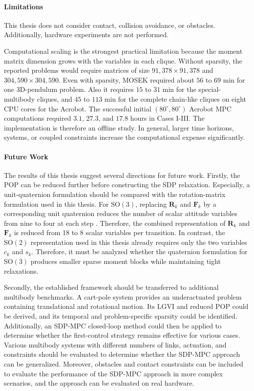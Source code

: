 \paragraph{Limitations}

This thesis does not consider contact, collision avoidance, or obstacles. Additionally,
hardware experiments are not performed.

Computational scaling is the strongest practical limitation because the moment
matrix dimension grows with the variables in each clique. Without
sparsity, the reported problems would require matrices of size
$91{,}378\times91{,}378$ and $304{,}590\times304{,}590$. Even with sparsity,
MOSEK required about $56$ to $69$ min for one 3D-pendulum problem. Also 
it requires 
$15$ to $31$ min for the special-multibody cliques, and $45$ to $113$ min
for the complete chain-like cliques on eight CPU cores for the Acrobot. The successful initial
$(80^\circ,80^\circ)$ Acrobot MPC computations required $3.1$, $27.3$, and $17.8$ hours
in Cases I-III. The implementation is therefore an offline study. In general, larger
time horizons, systems, or coupled constraints increase the computational
expense significantly.

\paragraph{Future Work}

The results of this thesis suggest several directions for future work.
Firstly, the POP can be reduced further before constructing
the SDP relaxation. Especially, a unit-quaternion formulation should be compared
with the rotation-matrix formulation used in this thesis. For $\mathrm{SO}(3)$, replacing
$\bm{R}_k$ and $\bm{F}_k$ by a corresponding unit quaternion reduces the number of scalar attitude variables 
from nine to four at each step
\cite{BrudigamManchester2021VariationalIntegrators}. Therefore, the combined 
representation of $\bm{R}_k$ and $\bm{F}_k$ is reduced from 18 to 8 scalar 
variables per transition.
In contrast, the $\mathrm{SO}(2)$ representation used in this thesis already requires only 
the two variables $c_k$ and $s_k$. Therefore, it must be analyzed whether
the quaternion formulation for $\mathrm{SO}(3)$ produces smaller sparse moment blocks 
while maintaining tight relaxations.

Secondly, the established framework should be transferred to additional multibody benchmarks. A
cart-pole system provides an underactuated problem containing translational
and rotational motion. Its LGVI and reduced POP could be derived, and its temporal
and problem-specific sparsity could be identified. Additionally, an SDP-MPC closed-loop method 
could then be applied to
determine whether the first-control strategy remains effective for various cases. 
Various multibody systems with different numbers of links, actuation, and constraints
should be evaluated to determine whether the SDP-MPC approach can be generalized.
Moreover, obstacles and contact constraints can be included to evaluate the performance of the SDP-MPC 
approach in more complex scenarios, and the approach can be evaluated on real hardware.


